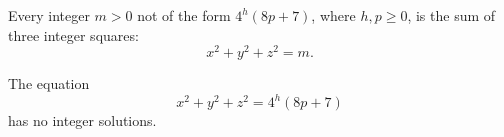 \begin{proposition}
Every integer $m>0$ not of the form $4^h(8p+7)$, where $h,p\ge0$, is the sum
of three integer squares:
\[
    x^2+y^2+z^2=m.
\]
\end{proposition}

\begin{proposition}
The equation
\[
    x^2+y^2+z^2=4^h(8p+7)
\]
has no integer solutions.
\end{proposition}
